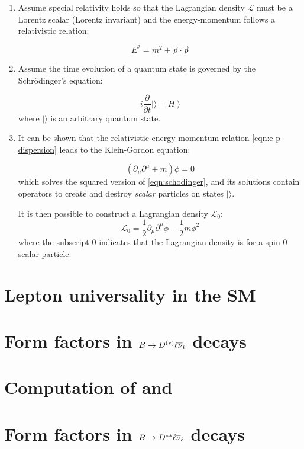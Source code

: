 \begin{enumerate}
    \item Assume special relativity holds so that the Lagrangian density
        $\mathcal{L}$
        must be a Lorentz scalar (Lorentz invariant) and the
        energy-momentum follows a relativistic relation:

        \begin{equation}
            E^2 = m^2 + \vec{p} \cdot \vec{p}
            \label{eqn:e-p-dispersion}
        \end{equation}

    \item Assume the time evolution of a quantum state is governed by the
        Schrödinger's equation:

        \begin{equation}
            i \frac{\partial}{\partial t} | \rangle = H | \rangle
            \label{eqn:schodinger}
        \end{equation}
        where $| \rangle$ is an arbitrary quantum state.

    \item It can be shown that the relativistic energy-momentum relation
        \cref{eqn:e-p-dispersion} leads to the Klein-Gordon equation:

        \begin{equation}
            (\partial_\mu \partial^\mu + m) \phi = 0
        \end{equation}
        which solves the squared version of \cref{eqn:schodinger},
        and its solutions contain operators to create and destroy \emph{scalar}
        particles on states $| \rangle$.

        It is then possible to construct a Lagrangian density $\mathcal{L}_0$:
        \begin{equation}
            \mathcal{L}_0 = \frac{1}{2} \partial_\mu \partial^\mu \phi -
                \frac{1}{2} m \phi^2
        \end{equation}
        where the subscript 0 indicates that the Lagrangian density is for a
        spin-0 scalar particle.
\end{enumerate}


\section{Lepton universality in the SM}
\label{ref:theory:lfu}


\section{Form factors in $B \rightarrow D^{(*)}\ell{\ensuremath{{\overline{\nu}}_\ell}}$ decays}
\label{ref:theory:ff-d0-dst}


\section{Computation of \RD and \RDst}
\label{ref:theory:rdx}


\section{Form factors in $B \rightarrow D^{**}\ell{\ensuremath{{\overline{\nu}}_\ell}}$ decays}
\label{ref:theory:ff-dstst}
